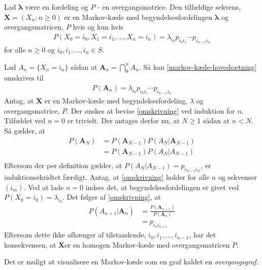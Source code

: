 \begin{minipage}\textwidth
\begin{thmx} \textbf{} %
\newline
Lad $\bm{\lambda}$ være en fordeling og $P$ - en overgangsmatrice. Den tilfældige sekvens, $\mathbf{X}=(X_n:n\geq0)$ er en Markov-kæde med begyndelsesfordelingen $\bm{\lambda}$ og overgangsmatricen, $P$ hvis og kun hvis
\begin{align}\label{markov-kæde-hovedsætning}
    P(X_0=i_0,X_1=i_1,\dots, X_n=i_n)=\lambda_{i_0}p_{i_0i_1}\cdots p_{i_{n-1}i_n}
\end{align}
for alle $n\geq0$ og $i_0,i_1,\dots,i_n\in S$.
\end{thmx}
\end{minipage}
\begin{bev}
Lad $A_n=\{X_n=i_n\}$ sådan at $\bm A_n=\bigcap_0^n A_n$. Så kan \eqref{markov-kæde-hovedsætning} omskrives til
\begin{align}\label{omskrivning}
    P(\bm A_n)=\lambda_{i_0}p_{i_0i_1}\cdots p_{i_{n-1}i_n}
\end{align}
Antag, at $\bm X$ er en Markov-kæde med begyndelsesfordeling, $\lambda$ og overgangsmatrice, $P$. Der ønskes at bevise \eqref{omskrivning} ved induktion for $n$. Tilfældet ved $n=0$ er trivielt. Der antages derfor nu, at $N\geq1$ sådan at $n<N$. Så gælder, at
\begin{align*}
    P(\bm A_N)&=P(\bm A_{N-1})P(A_N|\bm A_{N-1})\\
    &=P(\bm A_{N-1})P(A_N|A_{N-1})\\
\end{align*}
Eftersom der per definition gælder, at
$P(A_N|A_{N-1})=p_{i_{N-1}i_N}$, er induktionsskridtet færdigt. 
Antag, at \eqref{omskrivning} holder for alle $n$ og sekvenser $(i_m)$. Ved at lade $n=0$ indses det, at begyndelsesfordelingen er givet ved $P(X_0=i_0)=\lambda_{i_0}$. Det følger af \eqref{omskrivning}, at
\begin{align*}
    P(A_{n+1}|\bm A_n)&=\frac{P(\bm A_{n+1})}{P(\bm A_n)}\\
    &=p_{i_ni_{n+1}}
\end{align*}
Eftersom dette ikke afhænger af tilstandende, $i_0,i_1,\dots,i_{n-1}$, har det konsekvensen, at $\bm X$er en homogen Markov-kæde med overgangsmatricen $P$.

\end{bev}

Det er muligt at visualisere en Markov-kæde som en graf kaldet en \textit{overgangsgraf}. 

